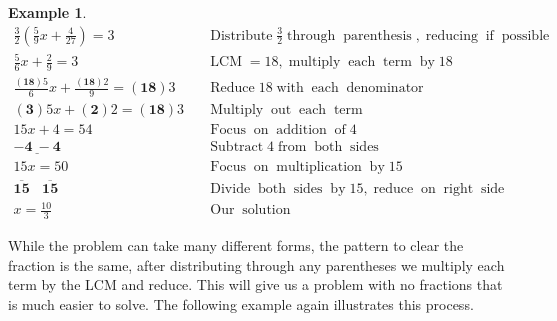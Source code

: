 \documentclass[12pt]{book}
\theoremstyle{definition}
\newtheorem{example}{Example}
\newcommand{\tmmathbf}[1]{\ensuremath{\boldsymbol{#1}}}
\newcommand{\tmop}[1]{\ensuremath{\operatorname{#1}}}
\begin{document}
\begin{example}\label{Lin32}
  \begin{eqnarray*}
    \frac{3}{2} \left( \frac{5}{9} x + \frac{4}{27} \right) = 3 &  &
    \tmop{Distribute} \frac{3}{2} \tmop{through} \tmop{parenthesis},
    \tmop{reducing} \tmop{if} \tmop{possible}\\
    \frac{5}{6} x + \frac{2}{9} = 3 &  & \tmop{LCM} = 18, \tmop{multiply}
    \tmop{each} \tmop{term} \tmop{by} 18\\
    \frac{\tmmathbf{(18)} 5}{6} x + \frac{\tmmathbf{(18)} 2}{9} =
    \tmmathbf{(18)} 3 &  & \tmop{Reduce} 18 \tmop{with} \tmop{each}
    \tmop{denominator}\\
    \tmmathbf{(3)} 5 x + \tmmathbf{(2)} 2 = \tmmathbf{(18)} 3 &  &
    \tmop{Multiply} \tmop{out} \tmop{each} \tmop{term}\\
    15 x + 4 = 54 &  & \tmop{Focus} \tmop{on} \tmop{addition} \tmop{of} 4\\
    \underline{\tmmathbf{- 4 ~- 4}} &  & \tmop{Subtract} 4 \tmop{from}
    \tmop{both} \tmop{sides}\\
    15 x = 50 &  & \tmop{Focus} \tmop{on} \tmop{multiplication} \tmop{by} 15\\
     \tmmathbf{\overline{15} ~~~~ \overline{15}} &  & \tmop{Divide} \tmop{both}
    \tmop{sides} \tmop{by} 15, \tmop{reduce} \tmop{on} \tmop{right}
    \tmop{side}\\
    x = \frac{10}{3} &  & \tmop{Our} \tmop{solution}
  \end{eqnarray*}
\end{example}
While the problem can take many different forms, the pattern to clear the fraction is the same, after distributing through any parentheses we multiply each term by the LCM and reduce. This will give us a problem with no fractions that is much easier to solve. The following example again illustrates this process.
\end{document}
